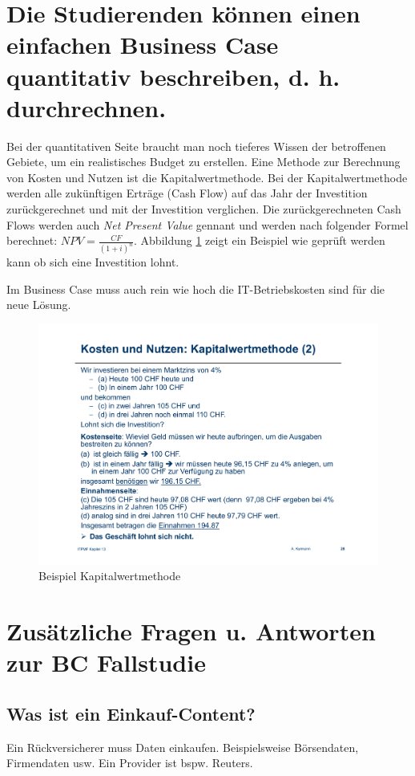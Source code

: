\section{Die Studierenden können einen einfachen Business Case quantitativ beschreiben, d. h. durchrechnen.}

Bei der quantitativen Seite braucht man noch tieferes Wissen der betroffenen Gebiete, um ein realistisches Budget zu erstellen. Eine Methode zur Berechnung von Kosten und Nutzen ist die Kapitalwertmethode. Bei der Kapitalwertmethode werden alle zukünftigen Erträge (Cash Flow) auf das Jahr der Investition zurückgerechnet und mit der Investition verglichen. Die zurückgerechneten Cash Flows werden auch \emph{Net Present Value} gennant und werden nach folgender Formel berechnet: $NPV=\frac{CF}{(1+i)^n}$. Abbildung \ref{fig:kapitalwertmethode} zeigt ein Beispiel wie geprüft werden kann ob sich eine Investition lohnt.

Im Business Case muss auch rein wie hoch die IT-Betriebskosten sind für die neue Lösung.

\begin{figure}
\centering
\includegraphics[width=\linewidth]{fig/kapitalwertmethode}
\caption{Beispiel Kapitalwertmethode}
\label{fig:kapitalwertmethode}
\end{figure}

\section{Zusätzliche Fragen u. Antworten zur BC Fallstudie}
\subsection{Was ist ein Einkauf-Content?}
Ein Rückversicherer muss Daten einkaufen. Beispielsweise Börsendaten, Firmendaten usw. Ein Provider ist bspw. Reuters.

